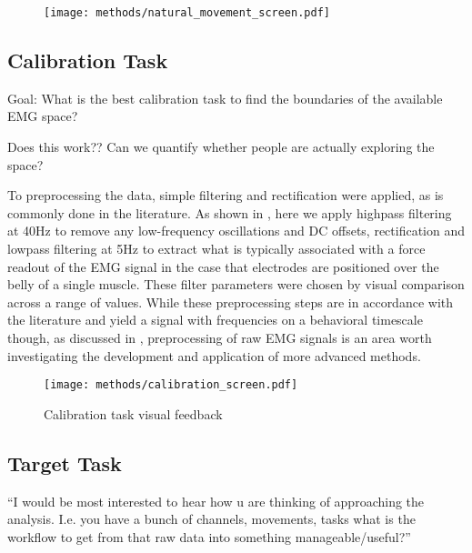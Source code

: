 \documentclass[../main.tex]{subfiles}
\begin{document}
\begin{figure}
\centering
  \texttt{[image: methods/natural\_movement\_screen.pdf]}
  \caption[Movement task visual feedback]{}\label{fig:movement_task_screen}
\end{figure}




\subsection{Calibration Task}

Goal: What is the best calibration task to find the boundaries of the available EMG space? 

Does this work?? Can we quantify whether people are actually exploring the space?

To preprocessing the data, simple filtering and rectification were applied, as is commonly done in the literature\cite{@sangerBayesianFilteringMyoelectric2007;@churchlandNeuralPopulationDynamics2012a;@churchlandNeuralVariabilityPremotor2006;@sussillo2015}. As shown in , here we apply highpass filtering at 40Hz to remove any low-frequency oscillations and DC offsets, rectification and lowpass filtering at 5Hz to extract what is typically associated with a force readout of the EMG signal in the case that electrodes are positioned over the belly of a single muscle. These filter parameters were chosen by visual comparison across a range of values. While these preprocessing steps are in accordance with the literature and yield a signal with frequencies on a behavioral timescale though, as discussed in , preprocessing of raw EMG signals is an area worth investigating the development and application of more advanced methods.

\begin{figure}
  \centering
    \texttt{[image: methods/calibration\_screen.pdf]}
    \caption{Calibration task visual feedback}\label{fig:calibration_task_screen}
  \end{figure}

\subsection{Target Task}

``I would be most interested to hear how u are thinking of approaching the analysis. I.e. you have a bunch of channels, movements, tasks what is the workflow to get from that raw data into something manageable/useful?''
\end{document}
